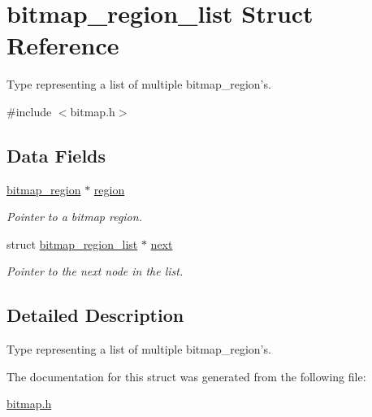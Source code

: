 \hypertarget{structbitmap__region__list}{
\section{bitmap\_\-region\_\-list Struct Reference}
\label{structbitmap__region__list}
}


Type representing a list of multiple bitmap\_\-region's.  




{\ttfamily \#include $<$bitmap.h$>$}

\subsection*{Data Fields}
\begin{DoxyCompactItemize}
\item 
\hypertarget{structbitmap__region__list_a376bbf12235654517689131d4e1c5fa8}{
\hyperlink{structbitmap__region}{bitmap\_\-region} $\ast$ \hyperlink{structbitmap__region__list_a376bbf12235654517689131d4e1c5fa8}{region}}
\label{structbitmap__region__list_a376bbf12235654517689131d4e1c5fa8}

\begin{DoxyCompactList}\small\item\em Pointer to a bitmap region. \item\end{DoxyCompactList}\item 
\hypertarget{structbitmap__region__list_ad2aad40e3d47f131b7525a558d827f3d}{
struct \hyperlink{structbitmap__region__list}{bitmap\_\-region\_\-list} $\ast$ \hyperlink{structbitmap__region__list_ad2aad40e3d47f131b7525a558d827f3d}{next}}
\label{structbitmap__region__list_ad2aad40e3d47f131b7525a558d827f3d}

\begin{DoxyCompactList}\small\item\em Pointer to the next node in the list. \item\end{DoxyCompactList}\end{DoxyCompactItemize}


\subsection{Detailed Description}
Type representing a list of multiple bitmap\_\-region's. 

The documentation for this struct was generated from the following file:\begin{DoxyCompactItemize}
\item 
\hyperlink{bitmap_8h}{bitmap.h}\end{DoxyCompactItemize}
